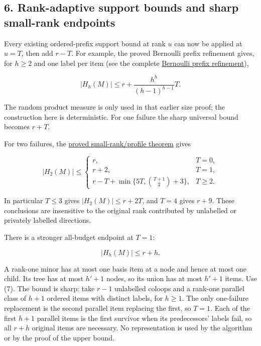 \hypertarget{af-b2bf8a6e14-rank-adaptive-support-bounds-and-sharp-small-rank-endpoints}{%
\subsection{6. Rank-adaptive support bounds and sharp small-rank endpoints}\label{af-b2bf8a6e14-rank-adaptive-support-bounds-and-sharp-small-rank-endpoints}}

Every existing ordered-prefix support bound at rank \(u\) can now be applied at \(u=T\), then add \(r-T\). For example, the proved Bernoulli prefix refinement gives, for \(h\ge2\) and one label per item (see the complete \href{https://github.com/icekylinx/algorithm-frontier/blob/main/problems/matroid-failure-summaries/manuscripts/weighted-oracle-prefix-fpt-construction.md}{Bernoulli prefix refinement}),

\[
|H_h(M)|\le r+
\frac{h^h}{(h-1)^{h-1}}T.
\tag{9}
\]

The random product measure is only used in that earlier size proof; the construction here is deterministic. For one failure the sharp universal bound becomes \(r+T\).

For two failures, the \href{https://github.com/icekylinx/algorithm-frontier/blob/main/problems/matroid-failure-summaries/manuscripts/two-failure-oracle-prefix-bounds.md}{proved small-rank/profile theorem} gives

\[
|H_2(M)|\le
\begin{cases}
r,&T=0,\\
r+2,&T=1,\\
r-T+\min\{5T,\binom{T+1}{2}+3\},&T\ge2.
\end{cases}
\tag{10}
\]

In particular \(T\le3\) gives \(|H_2(M)|\le r+2T\), and \(T=4\) gives \(r+9\). These conclusions are insensitive to the original rank contributed by unlabelled or privately labelled directions.

There is a stronger all-budget endpoint at \(T=1\):

\[
|H_h(M)|\le r+h.
\tag{11}
\]

A rank-one minor has at most one basis item at a node and hence at most one child. Its tree has at most \(h'+1\) nodes, so its union has at most \(h'+1\) items. Use (7). The bound is sharp: take \(r-1\) unlabelled coloops and a rank-one parallel class of \(h+1\) ordered items with distinct labels, for \(h\ge1\). The only one-failure replacement is the second parallel item replacing the first, so \(T=1\). Each of the first \(h+1\) parallel items is the first survivor when its predecessors' labels fail, so all \(r+h\) original items are necessary. No representation is used by the algorithm or by the proof of the upper bound.

